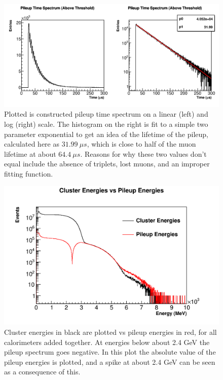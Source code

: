 	\begin{figure}[]
		\centering
		\includegraphics[width=\textwidth]{Figures/Pileup/TimeSpectra/PileupTimeSpectrum}
	    \caption[PileupTimeSpectrum]{Plotted is constructed pileup time spectrum on a linear (left) and log (right) scale. The histogram on the right is fit to a simple two parameter exponential to get an idea of the lifetime of the pileup, calculated here as $\SI{31.99}{\mu s}$, which is close to half of the muon lifetime at about $\SI{64.4}{\mu s}$. Reasons for why these two values don't equal include the absence of triplets, lost muons, and an improper fitting function.}
	    \label{fig:PileupTimeSpectrum}
	\end{figure}

	\begin{figure}[]
		\centering
		\includegraphics[width=\textwidth]{ClusterEnergiesVsPileupEnergies}
	    \caption[ClusterEnergiesVsPileupEnergies]{Cluster energies in black are plotted vs pileup energies in red, for all calorimeters added together. At energies below about 2.4 GeV the pileup spectrum goes negative. In this plot the absolute value of the pileup energies is plotted, and a spike at about 2.4 GeV can be seen as a consequence of this.}    
	    \label{fig:ClusterEnergiesVsPileupEnergies}
	\end{figure}

